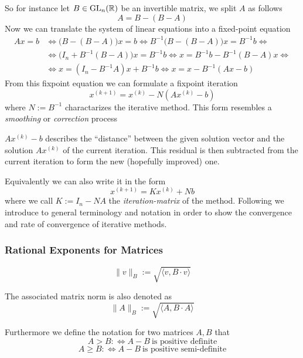 So for instance let \(B \in \operatorname{GL}_n(\mathbb{R})\) be an invertible matrix, we split \(A\) as follows
\[A = B - (B - A)\]
Now we can translate the system of linear equations into a fixed-point equation
\begin{equation*}
   \begin{split}
      Ax = b & \iff \big(B - (B - A)\big)x = b \iff B^{-1}\big(B - (B - A)\big)x = B^{-1}b \iff \\
             & \iff \big(I_n + B^{-1}(B - A)\big)x = B^{-1}b \iff x = B^{-1}b - B^{-1}(B - A)x \iff \\
             & \iff x = (I_n - B^{-1}A)x + B^{-1}b \iff x = x - B^{-1}(Ax - b)
   \end{split}
\end{equation*}
From this fixpoint equation we can formulate a fixpoint iteration
\begin{equation}\label{eq:iter_smooth}
   x^{(k+1)} = x^{(k)} - N(Ax^{(k)} - b)
\end{equation}
where \(N := B^{-1}\) charactarizes the iterative method.
This form resembles a \emph{smoothing} or \emph{correction} process

\(Ax^{(k)} - b\) describes the ``distance'' between the given solution vector and the solution \(Ax^{(k)}\) of the current iteration.
This residual is then subtracted from the current iteration to form the new (hopefully improved) one.

Equivalently we can also write it in the form
\begin{equation}\label{eq:iter_mat}
   x^{(k+1)} = Kx^{(k)} + Nb
\end{equation}
where we call \(K := I_n - NA\) the \emph{iteration-matrix} of the method.
Following we introduce to general terminology and notation in order to show the convergence and rate of convergence of iterative methods.

\subsubsection{Rational Exponents for Matrices}
\begin{definition}
   \[\|v\|_B := \sqrt{\langle v, B \cdot v\rangle}\]
\end{definition}
\begin{remark}
   The associated matrix norm is also denoted as
   \[\|A\|_B := \sqrt{\langle A, B \cdot A\rangle}\]
\end{remark}

Furthermore we define the notation for two matrices \(A, B\) that
\[A > B :\iff A - B~\text{is positive definite}\]
\[A \geq B :\iff A - B~\text{is positive semi-definite}\]

